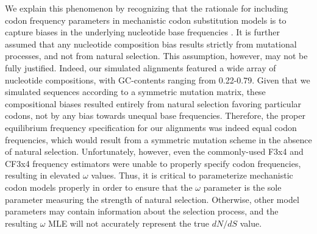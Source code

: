 \documentclass[11pt]{article}
\begin{document}
We explain this phenomenon by recognizing that the rationale for including codon frequency parameters in mechanistic codon substitution models is to capture biases in the underlying nucleotide base frequencies \cite{YN00, Yang2006}. It is further assumed that any nucleotide composition bias results strictly from mutational processes, and not from natural selection. This assumption, however, may not be fully justified. Indeed, our simulated alignments featured a wide array of nucleotide compositions, with GC-contents ranging from 0.22-0.79. Given that we simulated sequences according to a symmetric mutation matrix, these compositional biases resulted entirely from natural selection favoring particular codons, not by any bias towards unequal base frequencies. Therefore, the proper equilibrium frequency specification for our alignments was indeed equal codon frequencies, which would result from a symmetric mutation scheme in the absence of natural selection. Unfortunately, however, even the commonly-used F3x4 and CF3x4 frequency estimators were unable to properly specify codon frequencies, resulting in elevated $\omega$ values. Thus, it is critical to parameterize mechanistic codon models properly in order to ensure that the $\omega$ parameter is the sole parameter measuring the strength of natural selection. Otherwise, other model parameters may contain information about the selection process, and the resulting $\omega$ MLE will not accurately represent the true $dN/dS$ value. 
\end{document}
